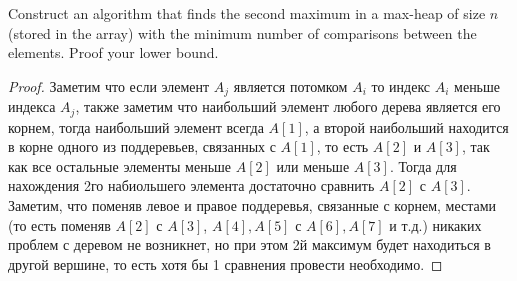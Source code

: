 \begin{prob}
Construct an algorithm that finds the second maximum in a max-heap of size $n$ (stored in the array) with the minimum number of comparisons between the elements. Proof your lower bound.
\end{prob}
\vskip 0.2in
\begin{proof}
Заметим что если элемент $A_j$ является потомком $A_i$ то индекс $A_i$ меньше индекса $A_j$, также заметим что наибольший элемент любого дерева является его корнем, тогда наибольший элемент всегда $A[1]$, а второй наибольший находится в корне одного из поддеревьев, связанных с $A[1]$, то есть $A[2]$ и $A[3]$, так как все остальные элементы меньше $A[2]$ или меньше $A[3]$. Тогда для нахождения 2го набиольшего элемента достаточно сравнить $A[2]$ с $A[3]$.
Заметим, что поменяв левое и правое поддеревья, связанные с корнем, местами (то есть поменяв $A[2]$ с $A[3]$, $A[4], A[5]$ с $A[6], A[7]$ и т.д.) никаких проблем с деревом не возникнет, но при этом 2й максимум будет находиться в другой вершине, то есть хотя бы 1 сравнения провести необходимо.
\end{proof}
\newpage




